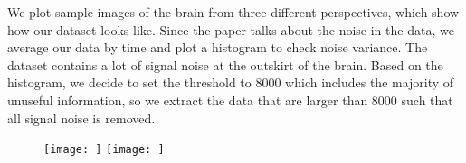 We plot sample images of the brain from three different perspectives, which 
show how our dataset looks like. Since the paper talks about the noise 
in the data, we average our data by time and plot a histogram to check noise 
variance. The dataset contains a lot of signal noise at the outskirt of the 
brain. Based on the histogram, we decide to set the threshold to 8000 which 
includes the majority of unuseful information, so we extract the data that are 
larger than 8000 such that all signal noise is removed.
\begin{figure}
\texttt{[image: ]}
\texttt{[image: ]}
\end{figure}
